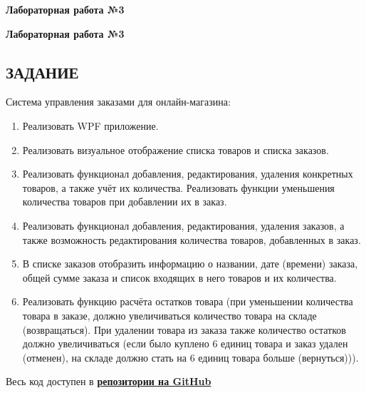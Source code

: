 \documentclass[12pt]{article}
\newcommand{\lablogo}
{
\begin{center}
    \huge{\textbf{Лабораторная работа №3}} \\
\end{center}
}
\newcommand{\colorURL}[1]{\textbf{#1}}
\renewcommand{\texttt}[1]{{\small\ttfamily #1}}
\numberwithin{listing}{section}
\numberwithin{figure}{section}
\begin{document}
\pagestyle{empty}

\lablogo

\tableofcontents
\newpage
\renewcommand\listoflistingscaption{Листинг}
\listoffigures

\newpage

\pagestyle{fancy}

\newpage

\lablogo

\begin{center}
	\section{ЗАДАНИЕ}
\end{center}

\noindent Система управления заказами для онлайн-магазина:
\begin{enumerate}
	\item Реализовать \texttt{WPF} приложение.
	\item Реализовать визуальное отображение списка товаров и списка заказов.
	\item Реализовать функционал добавления, редактирования, удаления конкретных товаров, а также учёт их количества. Реализовать функции уменьшения количества товаров при добавлении их в заказ.
	\item Реализовать функционал добавления, редактирования, удаления заказов, а также возможность редактирования количества товаров, добавленных в заказ.
	\item В списке заказов отобразить информацию о названии, дате (времени) заказа, общей сумме заказа и список входящих в него товаров и их количества.
	\item Реализовать функцию расчёта остатков товара (при уменьшении количества товара в заказе, должно увеличиваться количество товара на складе (возвращаться). При удалении товара из заказа также количество остатков должно увеличиваться (если было куплено 6 единиц товара и заказ удален (отменен), на складе должно стать на 6 единиц товара больше (вернуться))).
\end{enumerate}
Весь код доступен в \colorURL{\href{https://github.com/WebMasterIT/Csharp_Labs/tree/main}{репозитории на GitHub}}

\newpage
\end{document}
